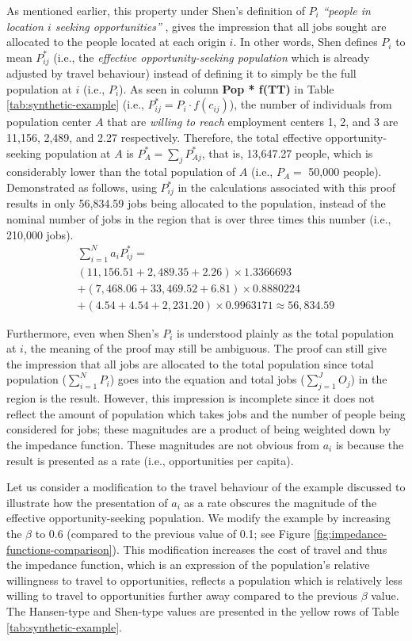 \documentclass[]{elsarticle} %
\begin{document}
As mentioned earlier, this property under Shen's definition of \(P_i\)
\emph{``people in location \(i\) seeking opportunities''} , gives the
impression that all jobs sought are allocated to the people located at
each origin \(i\). In other words, Shen defines \(P_i\) to mean
\(P_{ij}^*\) (i.e., the \emph{effective opportunity-seeking population}
which is already adjusted by travel behaviour) instead of defining it to
simply be the full population at \(i\) (i.e., \(P_i\)). As seen in
column \textbf{Pop * f(TT)} in Table \ref{tab:synthetic-example} (i.e.,
\(P_{ij}^* = P_i\cdot f(c_{ij})\)), the number of individuals from
population center \(A\) that are \emph{willing to reach} employment
centers 1, 2, and 3 are 11,156, 2,489, and 2.27 respectively. Therefore,
the total effective opportunity-seeking population at \(A\) is
\(P_A^* = \sum_jP_{Aj}^*\), that is, 13,647.27 people, which is
considerably lower than the total population of \(A\) (i.e., \(P_A=\)
50,000 people). Demonstrated as follows, using \(P_{ij}^*\) in the
calculations associated with this proof results in only 56,834.59 jobs
being allocated to the population, instead of the nominal number of jobs
in the region that is over three times this number (i.e., 210,000 jobs).
\[
\begin{array}{l}
\sum_{i=1}^N a_{i} P_{ij}^* =\\
(11,156.51 + 2,489.35 + 2.26)\times 1.3366693 \\
+ (7,468.06 + 33,469.52 + 6.81)\times 0.8880224\\
+ (4.54 + 4.54 + 2,231.20)\times 0.9963171 \approx 56,834.59
\end{array}
\]

Furthermore, even when Shen's \(P_i\) is understood plainly as the total
population at \(i\), the meaning of the proof may still be ambiguous.
The proof can still give the impression that all jobs are allocated to
the total population since total population (\(\sum_{i=1}^N P_i\)) goes
into the equation and total jobs (\(\sum_{j=1}^JO_j\)) in the region is
the result. However, this impression is incomplete since it does not
reflect the amount of population which takes jobs and the number of
people being considered for jobs; these magnitudes are a product of
being weighted down by the impedance function. These magnitudes are not
obvious from \(a_i\) is because the result is presented as a rate (i.e.,
opportunities per capita).

Let us consider a modification to the travel behaviour of the example
discussed to illustrate how the presentation of \(a_i\) as a rate
obscures the magnitude of the effective opportunity-seeking population.
We modify the example by increasing the \(\beta\) to 0.6 (compared to
the previous value of 0.1; see Figure
\ref{fig:impedance-functions-comparison}). This modification increases
the cost of travel and thus the impedance function, which is an
expression of the population's relative willingness to travel to
opportunities, reflects a population which is relatively less willing to
travel to opportunities further away compared to the previous \(\beta\)
value. The Hansen-type and Shen-type values are presented in the yellow
rows of Table \ref{tab:synthetic-example}.
\end{document}
